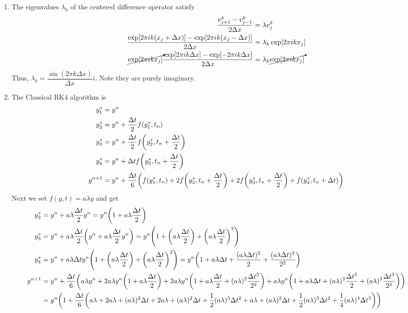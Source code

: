 \documentclass{article} %
\theoremstyle{plain}
\newcommand{\Dt}{\Delta t}
\numberwithin{equation}{section} %
\numberwithin{figure}{section} %
\numberwithin{table}{section} %
\begin{document}
\begin{enumerate}[\ \ (a)]
    \item The eigenvalues $\lambda_k$ of the centered difference operator satisfy
    \begin{align*}
        \frac{v_{j+1}^k - v_{j-1}^k}{2\Delta x} &= \lambda v_j^k \\
        \frac{\exp[2\pi i k(x_j + \Delta x)] - \exp[2\pi i k(x_j - \Delta x)]}{2\Delta x} &= \lambda_k \exp[2\pi i k x_j] \\
        \cancelto{}{\exp[2\pi ikx_j]}\frac{\exp[2\pi i k \Delta x] - \exp[-2\pi i k \Delta x]}{2\Delta x} &= \lambda_k \cancelto{}{\exp[2\pi i k x_j]}
    \end{align*}
    Thus, $\boxed{\lambda_k = \dfrac{\sin(2\pi k \Delta x)}{\Delta x}i}$.  Note they are purely imaginary.
    \item The Classical RK4 algorithm is
    \begin{align*}
        y_1^* &= y^n \\
        y_2^* &= y^n + \frac{\Dt}{2}f\qty(y_1^*,t_n)\\
        y_3^* &= y^n + \frac{\Dt}{2}f\qty(y_2^*,t_n + \frac{\Dt}{2}) \\
        y_4^* &= y^n + \Dt f\qty(y_3^*,t_n + \frac{\Dt}{2}) \\
        y^{n+1} &= y^n + \frac{\Dt}{6}\qty(f\qty(y_1^*,t_n) + 2f\qty(y_2^*,t_n + \frac{\Dt}{2}) + 2f\qty(y_3^*,t_n + \frac{\Dt}{2}) + f\qty(y_4^*,t_n + \Dt))
    \end{align*}
    Next we set $f(y,t) = a\lambda y$ and get
    \begin{align*}
        y_2^* &= y^n + a\lambda\frac{\Dt}{2}y^n = y^n\qty(1 + a\lambda\frac{\Dt}{2})\\
        y_3^* &= y^n + a\lambda\frac{\Dt}{2}\qty(y^n + a\lambda\frac{\Dt}{2}y^n) = y^n\qty(1 + \qty(a\lambda\frac{\Dt}{2}) + \qty(a\lambda\frac{\Dt}{2})^2) \\
        y_4^* &= y^n + a\lambda\Dt y^n\qty(1 + \qty(a\lambda\frac{\Dt}{2}) + \qty(a\lambda\frac{\Dt}{2})^2) = y^n\qty(1 + a\lambda\Dt + \frac{(a\lambda\Dt)^2}{2} + \frac{(a\lambda\Dt)^3}{2^2}) \\
        y^{n+1} &= y^n + \frac{\Dt}{6}\qty(a\lambda y^n + 2a\lambda y^n\qty(1 + a\lambda\frac{\Dt}{2}) + 2a\lambda y^n\qty(1 + a\lambda\frac{\Dt}{2} + (a\lambda)^2\frac{\Dt^2}{2^2}) + a\lambda y^n\qty(1 + a\lambda\Dt + (a\lambda)^2\frac{\Dt^2}{2} + (a\lambda)^3\frac{\Dt^3}{2^2})) \\
        &= y^n\qty(1 + \frac{\Dt}{6}\qty(a\lambda + 2a\lambda + (a\lambda)^2\Dt + 2a\lambda + (a\lambda)^2\Dt + \frac{1}{2}(a\lambda)^3\Dt^2 + a\lambda + (a\lambda)^2\Dt + \frac{1}{2}(a\lambda)^3\Dt^2 + \frac{1}{4}(a\lambda)^4\Dt^3)) \\

\end{align*}
\end{enumerate}
\end{document}
